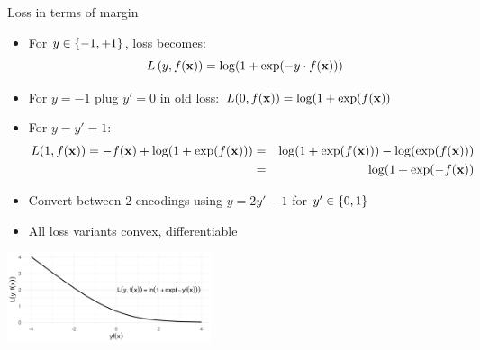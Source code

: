 \documentclass[11pt,compress,t,notes=noshow, xcolor=table]{beamer}
\begin{document}
\begin{vbframe}{Loss in terms of margin}

\begin{itemize}
\item For $y \in \{-1, +1\}$, loss becomes: 
$$
  L\left(y, f(\mathbf{x})\right) = \log(1+\exp(-y \cdot f(\mathbf{x}))) 
$$
 \item For $y=-1$ plug $y'=0$ in old loss: $L(0,f(\mathbf{x}))=\log(1+\exp(f(\mathbf{x}))$
 \item For $y=y'=1$: 
 \begin{eqnarray*}
  L(1,f(\mathbf{x}))=-f(\mathbf{x})+\log(1+\exp(f(\mathbf{x})))&=&\log(1+\exp(f(\mathbf{x})))-\log(\exp(f(\mathbf{x})))\\
  &=&\log(1+\exp(-f(\mathbf{x}))
\end{eqnarray*}
 
 \item Convert between 2 encodings using $y=2y'-1$ for $y' \in \{0, 1\}$
 \item All loss variants convex, differentiable
\end{itemize}

\begin{center}
\includegraphics[width = 6cm]{figure/bernoulli_margin.png}
\end{center}

\end{vbframe}
\end{document}
